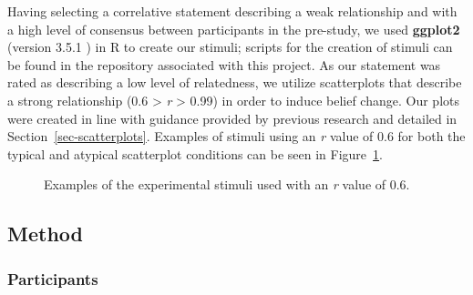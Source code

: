 \documentclass[manuscript,screen,review]{acmart}
\begin{document}
Having selecting a correlative statement describing a weak relationship
and with a high level of consensus between participants in the
pre-study, we used \textbf{ggplot2} (version 3.5.1 \citep{ggplot}) in R
to create our stimuli; scripts for the creation of stimuli can be found
in the repository associated with this project. As our statement was
rated as describing a low level of relatedness, we utilize scatterplots
that describe a strong relationship (0.6 \textgreater{} \emph{r}
\textgreater{} 0.99) in order to induce belief change. Our plots were
created in line with guidance provided by previous research and detailed
in Section~\ref{sec-scatterplots}. Examples of stimuli using an \emph{r}
value of 0.6 for both the typical and atypical scatterplot conditions
can be seen in Figure~\ref{fig-main-examples}.

\begin{figure}


\caption{\label{fig-main-examples}Examples of the experimental stimuli
used with an \textit{r} value of 0.6.}

\end{figure}%

\subsection{Method}\label{sec-method-main}

\subsubsection{Participants}\label{sec-participants-main}
\end{document}
